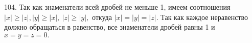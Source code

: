 104. Так как знаменатели всей дробей не меньше 1, имеем соотношения $|x|\geqslant |z|, |y|\geqslant |x|,\ |z|\geqslant |y|,$ откуда
$|x|=|y|=|z|.$ Так как каждое неравенство должно обращаться в равенство, все знаменатели дробей равны 1 и $x=y=z=0.$\\
